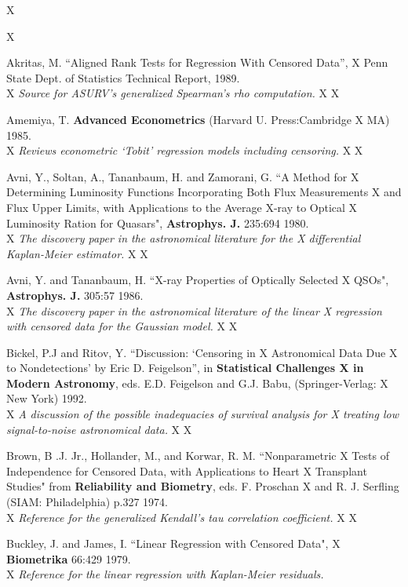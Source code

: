 X\begin{description}
X\item [] Akritas, M. ``Aligned Rank Tests for Regression With Censored Data'',
X   Penn State Dept. of Statistics Technical Report, 1989. \\
X   {\it Source for ASURV's generalized Spearman's rho computation.}
X
X\item [] Amemiya, T.  {\bf Advanced Econometrics} (Harvard U. Press:Cambridge 
X   MA) 1985. \\
X   {\it Reviews econometric `Tobit' regression models including censoring.}
X
X\item [] Avni, Y., Soltan, A., Tananbaum, H. and Zamorani, G. ``A Method for 
X   Determining Luminosity Functions Incorporating Both Flux Measurements 
X   and Flux Upper Limits, with Applications to the Average X-ray to Optical 
X   Luminosity Ration for Quasars", {\bf Astrophys. J.} 235:694 1980. \\
X   {\it The discovery paper in the astronomical literature for the 
X   differential Kaplan-Meier estimator.}
X
X\item [] Avni, Y. and Tananbaum, H. ``X-ray Properties of Optically Selected 
X    QSOs",     {\bf Astrophys. J.} 305:57 1986. \\
X   {\it The discovery paper in the astronomical literature of the linear 
X    regression with censored data for the Gaussian model.}
X
X\item [] Bickel, P.J and Ritov, Y. ``Discussion:  `Censoring in 
X    Astronomical Data Due
X    to Nondetections' by Eric D. Feigelson'', in {\bf Statistical Challenges
X    in Modern Astronomy}, eds. E.D. Feigelson and G.J. Babu, (Springer-Verlag:
X    New York) 1992. \\
X    {\it A discussion of the possible inadequacies of survival analysis for
X    treating low signal-to-noise astronomical data.}
X
X\item [] Brown, B .J. Jr., Hollander, M., and Korwar, R. M. ``Nonparametric 
X    Tests of Independence for Censored Data, with Applications to Heart 
X    Transplant Studies" from {\bf Reliability and Biometry}, eds. F. Proschan 
X    and R. J. Serfling (SIAM: Philadelphia) p.327 1974.\\
X    {\it Reference for the generalized Kendall's tau correlation coefficient.}
X
X\item [] Buckley, J. and James, I. ``Linear Regression with Censored Data", 
X    {\bf Biometrika} 66:429 1979.\\
X    {\it Reference for the linear regression with Kaplan-Meier residuals.}

\end{description}
